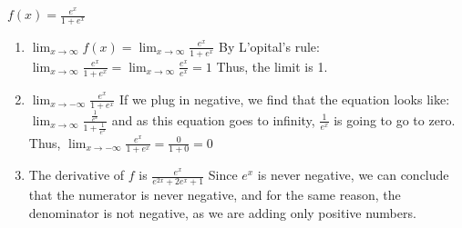 \documentclass[12pt]{exam}
\begin{document}
\newcommand{\dd}{\textrm{d}}
\newcommand{\NN}{\mathbb N}
\newcommand{\CC}{\mathbb C}
\newcommand{\QQ}{\mathbb Q}
\newcommand{\ZZ}{\mathbb Z}
\newcommand{\RR}{\mathbb R}
\newcommand{\proofdone}{\hfill $\square$}

$f(x) = \frac{e^x}{1+e^x}$
\begin{enumerate}
    \item $\lim_{x\rightarrow \infty} f(x) = \lim_{x\rightarrow \infty} \frac{e^x}{1+e^x}$ 
    By L'opital's rule: 
    $\lim_{x\rightarrow \infty} \frac{e^x}{1+e^x} = \lim_{x\rightarrow \infty} \frac{e^x}{e^x} = 1$
    Thus, the limit is 1. 
    
    \item $\lim_{x\rightarrow -\infty} \frac{e^x}{1+e^x}$ If we plug in negative, 
    we find that the equation looks like: $\lim_{x\rightarrow \infty} \frac{\frac{1}{e^x}}{1+\frac{1}{e^x}}$
    and as this equation goes to infinity, $\frac{1}{e^x}$ is going to go to zero. Thus, 
    $\lim_{x\rightarrow -\infty} \frac{e^x}{1+e^x} = \frac{0}{1 + 0} = 0$

    \item The derivative of $f$ is $\frac{e^x}{e^{2x} + 2e^x + 1}$ Since $e^x$ is never negative, 
    we can conclude that the numerator is never negative, and for the same reason, the denominator 
    is not negative, as we are adding only positive numbers. 
\end{enumerate}
\end{document}
